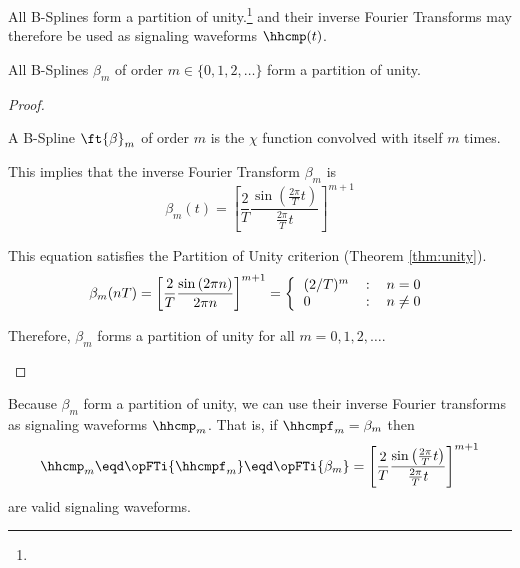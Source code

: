All B-Splines form a partition of unity.\footnote{}
and their inverse Fourier Transforms may therefore be used
as signaling waveforms $\hhcmp(t)$.
\begin{theorem}
All B-Splines $\beta_m$ of order $m\in\{0,1,2,\ldots\}$
form a partition of unity.
\end{theorem}
\begin{proof}
\begin{enume}
   \item A B-Spline $\ft{\beta}_m$ of order $m$
         is the $\chi$ function convolved with itself $m$ times.
   \item This implies that the inverse Fourier Transform $\beta_m$ is
         \[ \beta_m(t) =
             \left[
             \frac{2}{T}
             \frac{\sin\left(\frac{2\pi}{T}t\right)}{\frac{2\pi}{T}t}
             \right]^{m+1}
         \]
   \item This equation satisfies the Partition of Unity criterion (Theorem \ref{thm:unity}).
         \[ \beta_m(nT) =
             \left[
             \frac{2}{T}
             \frac{\sin\left(2\pi n\right)}{2\pi n}
             \right]^{m+1}
             = \left\{
                  \begin{tabular}{lcl}
                     $(2/T)^m$ & : & $n=0$ \\
                     $0$       & : & $n\neq0$
                  \end{tabular}
               \right.
         \]
   \item Therefore, $\beta_m$ forms a partition of unity for all $m=0,1,2,\ldots$.
\end{enume}
\end{proof}

Because $\beta_m$ form a partition of unity,
we can use their inverse Fourier transforms as signaling waveforms $\hhcmp_m$.
That is, if $\hhcmpf_m=\beta_m$ then
\[ \hhcmp_m \eqd \opFTi{\hhcmpf_m} \eqd \opFTi{\beta_m} =
             \left[
             \frac{2}{T}
             \frac{\sin\left(\frac{2\pi}{T}t\right)}{\frac{2\pi}{T}t}
             \right]^{m+1}
\]
are valid signaling waveforms.

